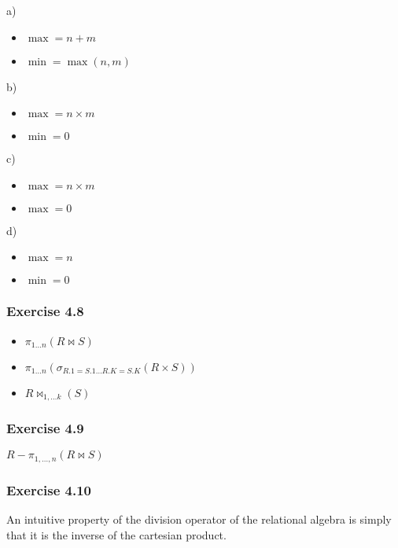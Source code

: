 \documentclass[../../main.tex]{subfiles}
\begin{document}
a)

\begin{itemize}
  \item $\max =  n + m$
  \item $\min = \max(n, m)$
\end{itemize}

b)

\begin{itemize}
  \item $\max = n \times m$
  \item $\min = 0$
\end{itemize}

c)

\begin{itemize}
  \item $\max = n \times m$
  \item $\max = 0$
\end{itemize}

d)

\begin{itemize}
  \item $\max = n$
  \item $\min = 0$
\end{itemize}

\subsubsection*{Exercise 4.8}

\begin{itemize}
  \item $\pi_{1\dots n}(R \bowtie S)$
  \item $\pi_{1\dots n}(\sigma_{R.1=S.1
        \dots R.K=S.K}(R \times S))$
  \item $R \bowtie_{1, \dots k}(S)$
\end{itemize}

\subsubsection*{Exercise 4.9}

$R - \pi_{1,\dots,n}(R \bowtie S)$

\subsubsection*{Exercise 4.10}

An intuitive property of the division operator of
the relational algebra is simply that it is the inverse
of the cartesian product.
\end{document}
